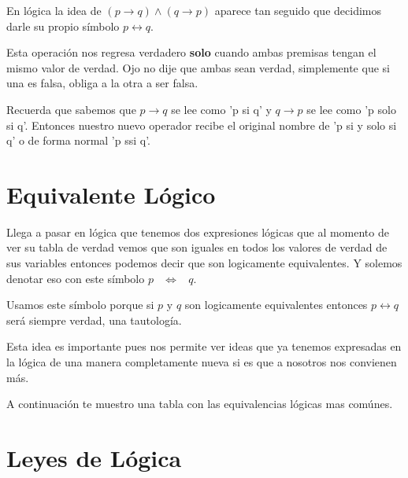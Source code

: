 \documentclass[12pt]{report}                                    %
\DeclareMathOperator \Space {\quad}                             %
\DeclareMathOperator \MiniSpace {\;}                            %
\DeclareMathOperator \doublearrow {\leftrightarrow}             %
\newcommand \lequal {\MiniSpace \Leftrightarrow \MiniSpace}     %
\begin{document}
                En lógica la idea de $(p \to q ) \land (q \to p)$ aparece tan seguido que decidimos darle su
                propio símbolo $p \doublearrow q$.

                Esta operación nos regresa verdadero \textbf{solo} cuando ambas premisas tengan el mismo valor de
                verdad. Ojo no dije que ambas sean verdad, simplemente que si una es falsa, obliga a la otra a 
                ser falsa.

                Recuerda que sabemos que $p \to q$ se lee como 'p si q' y $q \to p$ se lee como 'p solo si q'.
                Entonces nuestro nuevo operador recibe el original nombre de 'p si y solo si q' o de forma normal
                'p ssi q'.



        \section{Equivalente Lógico}

            Llega a pasar en lógica que tenemos dos expresiones lógicas que al momento de ver su tabla de 
            verdad vemos que son iguales en todos los valores de verdad de sus variables entonces podemos
            decir que son logicamente equivalentes. Y solemos denotar eso con este símbolo $p \lequal q$.

            Usamos este símbolo porque si $p$ y $q$ son logicamente equivalentes entonces $p \doublearrow q$
            será siempre verdad, una tautología.

            Esta idea es importante pues nos permite ver ideas que ya tenemos expresadas en la lógica de una
            manera completamente nueva si es que a nosotros nos convienen más.

            A continuación te muestro una tabla con las equivalencias lógicas mas comúnes.






        \clearpage
        \section{Leyes de Lógica}
                    
\end{document}
